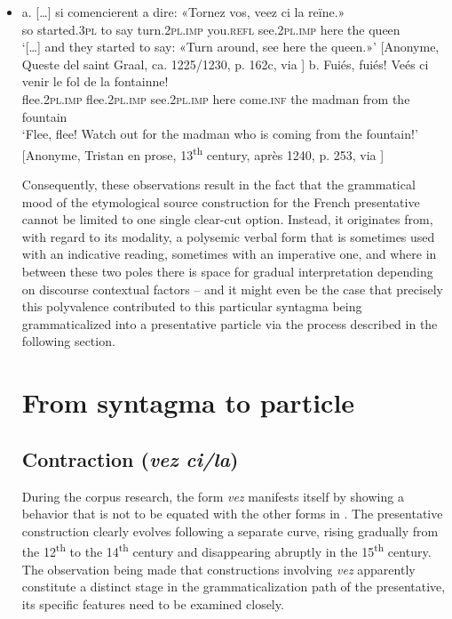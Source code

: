 \documentclass[output=paper]{langscibook}
\begin{document}
\begin{itemize}
\begin{itemize}
\begin{itemize}
\begin{itemize}
\begin{itemize}
\begin{itemize}
\begin{itemize}
\begin{itemize}
\begin{itemize}
\begin{itemize}
\begin{itemize}
\begin{itemize}
\item \gll \textup{a.} […] si comencierent a dire: «Tornez vos, veez ci la reïne.»\\
     so started.\textsc{3pl} to say turn.\textsc{2pl.imp} you.\textsc{refl} see.\textsc{2pl.imp} here the queen\\
\glt ‘[…] and they started to say: «Turn around, see here the queen.»’ [Anonyme, Queste del saint Graal, ca. 1225/1230, p. 162c, via \citealt{BFM2022}]
\z %
\gll \textup{b}. Fuiés, fuiés! Veés ci venir le fol de la fontainne!\\
     flee.\textsc{2pl.imp} flee.\textsc{2pl.imp} see.\textsc{2pl.imp} here come.\textsc{inf} the madman from the fountain\\
\glt ‘Flee, flee! Watch out for the madman who is coming from the fountain!’ [Anonyme, Tristan en prose, 13\textsuperscript{th} century, après 1240, p. 253, via \citealt{BFM2022}]
\z %

Consequently, these observations result in the fact that the grammatical mood of the etymological source construction for the French presentative cannot be limited to one single clear-cut option. Instead, it originates from, with regard to its modality, a polysemic verbal form that is sometimes used with an indicative reading, sometimes with an imperative one, and where in between these two poles there is space for gradual interpretation depending on discourse contextual factors – and it might even be the case that precisely this polyvalence contributed to this particular syntagma being grammaticalized into a presentative particle via the process described in the following section.

\section{From syntagma to particle} 
\subsection{Contraction (\textit{vez ci/la})}

During the corpus research, the form \textit{vez} manifests itself by showing a behavior that is not to be equated with the other forms in . The presentative construction clearly evolves following a separate curve, rising gradually from the 12\textsuperscript{th} to the 14\textsuperscript{th} century and disappearing abruptly in the 15\textsuperscript{th} century. The observation being made that constructions involving \textit{vez} apparently constitute a distinct stage in the grammaticalization path of the presentative, its specific features need to be examined closely.


\end{itemize}
\end{itemize}
\end{itemize}
\end{itemize}
\end{itemize}
\end{itemize}
\end{itemize}
\end{itemize}
\end{itemize}
\end{itemize}
\end{itemize}
\end{itemize}
\end{document}
